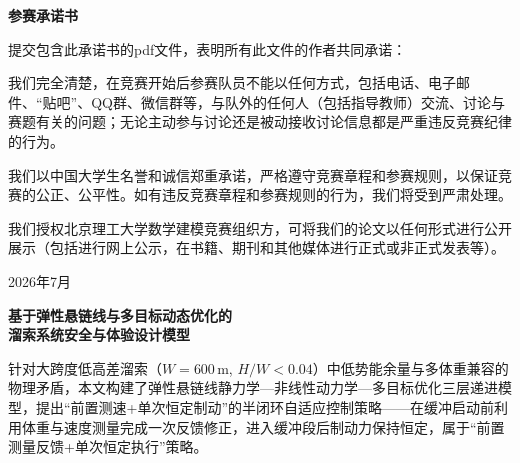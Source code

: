 \documentclass[12pt,a4paper]{ctexart}
\begin{document}
\thispagestyle{empty}

\begin{center}
  {\LARGE\bfseries 参赛承诺书}
\end{center}

\vspace{1.5cm}

提交包含此承诺书的pdf文件，表明所有此文件的作者共同承诺：

\vspace{0.8cm}

我们完全清楚，在竞赛开始后参赛队员不能以任何方式，包括电话、电子邮件、``贴吧''、QQ群、微信群等，与队外的任何人（包括指导教师）交流、讨论与赛题有关的问题；无论主动参与讨论还是被动接收讨论信息都是严重违反竞赛纪律的行为。

\vspace{0.8cm}

我们以中国大学生名誉和诚信郑重承诺，严格遵守竞赛章程和参赛规则，以保证竞赛的公正、公平性。如有违反竞赛章程和参赛规则的行为，我们将受到严肃处理。

\vspace{0.8cm}

我们授权北京理工大学数学建模竞赛组织方，可将我们的论文以任何形式进行公开展示（包括进行网上公示，在书籍、期刊和其他媒体进行正式或非正式发表等）。

\vspace{2cm}

\begin{flushright}
  2026年7月
\end{flushright}

\newpage

\thispagestyle{empty}

\begin{center}
  {\LARGE\bfseries 基于弹性悬链线与多目标动态优化的\\[6pt]溜索系统安全与体验设计模型}
\end{center}

\vspace{1cm}


\vspace{0.6cm}

\noindent
针对大跨度低高差溜索（$W=600$\,m, $H/W<0.04$）中低势能余量与多体重兼容的物理矛盾，本文构建了弹性悬链线静力学—非线性动力学—多目标优化三层递进模型，提出``前置测速+单次恒定制动''的半闭环自适应控制策略——在缓冲启动前利用体重与速度测量完成一次反馈修正，进入缓冲段后制动力保持恒定，属于``前置测量反馈+单次恒定执行''策略。
\end{document}
